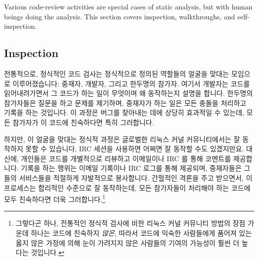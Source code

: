 Various code-review activities are special cases of static analysis, but
with human beings doing the analysis.
This section covers inspection, walkthroughs, and self-inspection.
\fi

\subsection{Inspection}
\label{sec:debugging:Inspection}

전통적으로, 정식적인 코드 검사는 정식적으로 정의된 역할들의 얼굴을 맞대는
모임으로 이루어졌습니다: 중재자, 개발자, 그리고 한두명의 참가자.
여기서 개발자는 코드를 읽어내려가면서 그 코드가 하는 일이 무엇이며 왜
동작하는지 설명을 합니다.
한두명의 참가자들은 질문을 하고 문제를 제기하며, 중재자가 하는 일은 모든 충돌을
처리하고 기록을 하는 것입니다.
이 과정은 버그를 찾아내는 데에 상당히 효과적일 수 있는데, 모든 참가자가 이
코드에 친숙하다면 특히 그러합니다.

하지만, 이 얼굴을 맞대는 정식적 과정은 글로벌한 리눅스 커널 커뮤니티에서는 잘
동작하지 못할 수 있습니다, IRC 세션을 사용하면 어쩌면 잘 동작할 수도
있겠지만요.
대신에, 개인들은 코드를 개별적으로 리뷰하고 이메일이나 IRC 를 통해 코멘트를
제공합니다.
기록을 하는 행위는 이메일 기록이나 IRC 로그를 통해 제공되며, 중재자들은 그들의
서비스들을 적절하게 자발적으로 봉사합니다.
간헐적인 격론을 주고 받으면서, 이 프로세스는 합리적인 수준으로 잘 동작하는데,
모든 참가자들이 처리해야 하는 코드에 모두 친숙하다면 더욱 그러합니다.\footnote{
	그렇다곤 하나, 전통적인 정식적 검사에 비한 리눅스 커널 커뮤니티 방법의
	장점 가운데 하나는 코드에 친숙하지 \emph{않은}, 따라서 코드에 익숙한
	사람들에게 품어져 있는 옳지 않은 가정에 의해 눈이 가려지지 않은
	사람들의 기여의 가능성이 훨씬 더 높다는 것입니다.}

